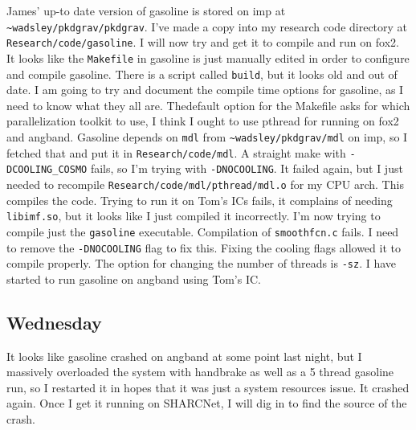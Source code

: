 \documentclass[11pt,letterpaper]{article}
\begin{document}
James' up-to date version of gasoline 
is stored on imp at \verb!~wadsley/pkdgrav/pkdgrav!.  I've made a copy into my 
research code directory at \verb!Research/code/gasoline!.  I will now try and 
get it to compile and run on fox2.  It looks like the \verb!Makefile! in 
gasoline is just manually edited in order to configure and compile gasoline.
There is a script called \verb!build!, but it looks old and out of date. I am 
going to try and document the compile time options for gasoline, as I need to 
know what they all are.  Thedefault option for the Makefile asks for which 
parallelization toolkit to use, I think I ought to use pthread for running on 
fox2 and angband.  Gasoline depends on \verb!mdl! from 
\verb!~wadsley/pkdgrav/mdl! on imp, so I fetched that and put it in 
\verb!Research/code/mdl!. A straight make with \verb!-DCOOLING_COSMO! fails, so
I'm trying with \verb!-DNOCOOLING!.  It failed again, but I just needed to 
recompile \verb!Research/code/mdl/pthread/mdl.o! for my CPU arch.  This compiles
the code.  Trying to run it on Tom's ICs fails, it complains of needing 
\verb!libimf.so!, but it looks like I just compiled it incorrectly.  I'm now 
trying to compile just the \verb!gasoline! executable.  Compilation of 
\verb!smoothfcn.c! fails.  I need to remove the \verb!-DNOCOOLING! flag to fix 
this.  Fixing the cooling flags allowed it to compile properly.  The option for
changing the number of threads is \verb!-sz!. I have started to run gasoline on
angband using Tom's IC.
\subsection*{Wednesday}
It looks like gasoline crashed on angband at some point last night, but I 
massively overloaded the system with handbrake as well as a 5 thread gasoline
run, so I restarted it in hopes that it was just a system resources issue.
It crashed again.  Once I get it running on SHARCNet, I will dig in to find 
the source of the crash.\\
\end{document}
